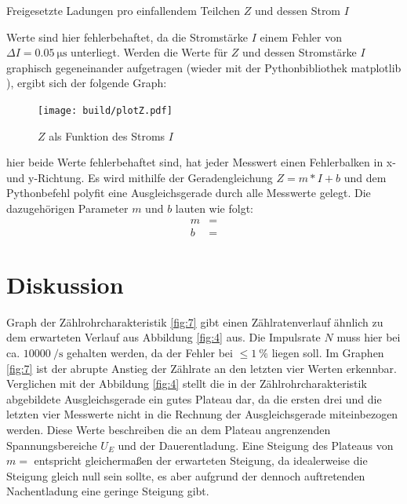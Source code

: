     \begin{table}[H]
        \centering
        
        \caption{Freigesetzte Ladungen pro einfallendem Teilchen $Z$ und dessen Strom $I$}
        \label{tab:3}
    \end{table}
    \justifying Werte sind hier fehlerbehaftet, da die Stromstärke $I$ einem Fehler von $\Delta I = \SI{0.05}{\micro\second}$
    unterliegt. Werden die Werte für $Z$ und dessen Stromstärke $I$ graphisch gegeneinander aufgetragen (wieder mit der Pythonbibliothek matplotlib
    \cite{matplotlib}), ergibt sich der folgende Graph:
    \begin{figure}[H]
        \centering
        \texttt{[image: build/plotZ.pdf]}
        \caption{$Z$ als Funktion des Stroms $I$}
        \label{fig:8}
    \end{figure}
    \justifying hier beide Werte fehlerbehaftet sind, hat jeder Messwert einen Fehlerbalken in x- und y-Richtung. Es wird 
    mithilfe der Geradengleichung $Z=m*I+b$ und dem Pythonbefehl polyfit \cite{numpy} eine Ausgleichsgerade durch alle Messwerte gelegt. 
    Die dazugehörigen Parameter $m$ und $b$ lauten wie folgt:
    \begin{align}
        m &= \text{}\\
        b &= \text{}
    \end{align}

\newpage
\section{Diskussion}

    \justifying Graph der Zählrohrcharakteristik \ref{fig:7} gibt einen Zählratenverlauf ähnlich zu dem erwarteten Verlauf
    aus Abbildung \ref{fig:4} aus. Die Impulsrate $N$ muss hier bei ca. $\SI{10000}{\per\second}$ gehalten werden, da der Fehler bei 
    $\leq \SI{1}{\percent}$ liegen soll. Im Graphen \ref{fig:7} ist der abrupte Anstieg der Zählrate an den letzten vier Werten erkennbar. Verglichen mit der Abbildung
    \ref{fig:4} stellt die in der Zählrohrcharakteristik abgebildete Ausgleichsgerade ein gutes Plateau dar, da die ersten drei und die letzten vier
    Messwerte nicht in die Rechnung der Ausgleichsgerade miteinbezogen werden. Diese Werte beschreiben die an dem Plateau angrenzenden
    Spannungsbereiche $U_E$ und der Dauerentladung. Eine Steigung des Plateaus von $m = \text{}$ entspricht gleichermaßen der 
    erwarteten Steigung, da idealerweise die Steigung gleich null sein sollte, es aber aufgrund der dennoch auftretenden Nachentladung eine 
    geringe Steigung gibt. 

